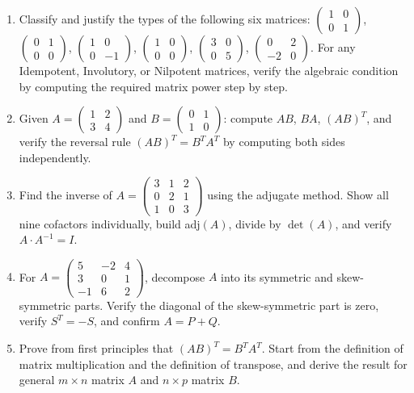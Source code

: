 \documentclass[12pt,a4paper]{article}
\begin{document}
\begin{enumerate}
  \item Classify and justify the types of the following six matrices: $\begin{pmatrix}1&0\\0&1\end{pmatrix}$, $\begin{pmatrix}0&1\\0&0\end{pmatrix}$, $\begin{pmatrix}1&0\\0&-1\end{pmatrix}$, $\begin{pmatrix}1&0\\0&0\end{pmatrix}$, $\begin{pmatrix}3&0\\0&5\end{pmatrix}$, $\begin{pmatrix}0&2\\-2&0\end{pmatrix}$. For any Idempotent, Involutory, or Nilpotent matrices, verify the algebraic condition by computing the required matrix power step by step.
  \item Given $A = \begin{pmatrix}1&2\\3&4\end{pmatrix}$ and $B = \begin{pmatrix}0&1\\1&0\end{pmatrix}$: compute $AB$, $BA$, $(AB)^T$, and verify the reversal rule $(AB)^T = B^T A^T$ by computing both sides independently.
  \item Find the inverse of $A = \begin{pmatrix}3&1&2\\0&2&1\\1&0&3\end{pmatrix}$ using the adjugate method. Show all nine cofactors individually, build adj$(A)$, divide by $\det(A)$, and verify $A \cdot A^{-1} = I$.
  \item For $A = \begin{pmatrix}5&-2&4\\3&0&1\\-1&6&2\end{pmatrix}$, decompose $A$ into its symmetric and skew-symmetric parts. Verify the diagonal of the skew-symmetric part is zero, verify $S^T = -S$, and confirm $A = P + Q$.
  \item Prove from first principles that $(AB)^T = B^T A^T$. Start from the definition of matrix multiplication and the definition of transpose, and derive the result for general $m \times n$ matrix $A$ and $n \times p$ matrix $B$.
\end{enumerate}
\end{document}
